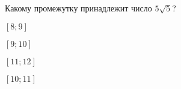 \begin{ex}
	Какому промежутку принадлежит число \(5\sqrt{5}\)?
	
	\selectanswer
	\begin{enumcols}[columns=4]
		\item $[8;9]$
		\item $[9;10]$
		\item $[11;12]$
		\item $[10;11]$
	\end{enumcols}
\end{ex}